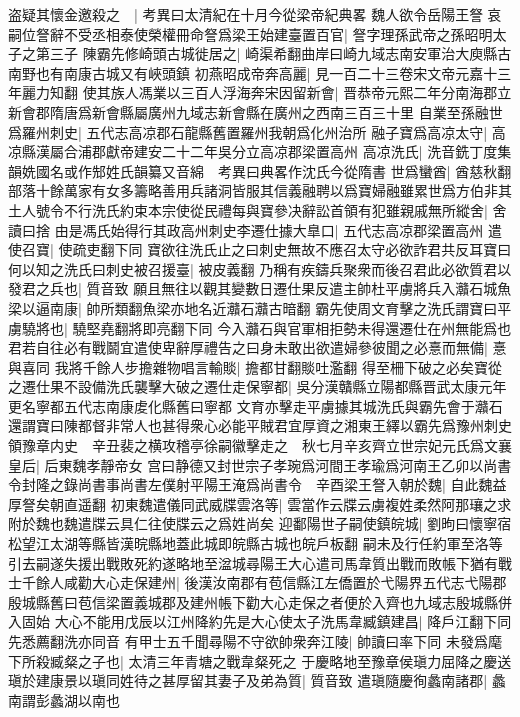 盗疑其懷金邀殺之　|{
	考異曰太清紀在十月今從梁帝紀典畧}
魏人欲令岳陽王詧哀嗣位詧辭不受丞相泰使榮權冊命詧爲梁王始建臺置百官|{
	詧字理孫武帝之孫昭明太子之第三子}
陳霸先修崎頭古城徙居之|{
	崎渠希翻曲岸曰崎九域志南安軍治大庾縣古南野也有南康古城又有峽頭鎮}
初燕昭成帝奔高麗|{
	見一百二十三卷宋文帝元嘉十三年麗力知翻}
使其族人馮業以三百人浮海奔宋因留新會|{
	晋恭帝元熙二年分南海郡立新會郡隋唐爲新會縣屬廣州九域志新會縣在廣州之西南三百三十里}
自業至孫融世爲羅州刺史|{
	五代志高凉郡石龍縣舊置羅州我朝爲化州治所}
融子寶爲高凉太守|{
	高凉縣漢屬合浦郡獻帝建安二十二年吳分立高凉郡梁置高州}
高凉洗氏|{
	洗音銑丁度集韻姺國名或作䢾姓氏韻纂又音綿　考異曰典畧作沈氏今從隋書}
世爲蠻酋|{
	酋慈秋翻}
部落十餘萬家有女多籌略善用兵諸洞皆服其信義融聘以爲寶婦融雖累世爲方伯非其土人號令不行洗氏約束本宗使從民禮每與寶參决辭訟首領有犯雖親戚無所縱舍|{
	舍讀曰捨}
由是馮氏始得行其政高州刺史李遷仕據大臯口|{
	五代志高凉郡梁置高州}
遣使召寶|{
	使疏吏翻下同}
寶欲往洗氏止之曰刺史無故不應召太守必欲詐君共反耳寶曰何以知之洗氏曰刺史被召援臺|{
	被皮義翻}
乃稱有疾鑄兵聚衆而後召君此必欲質君以發君之兵也|{
	質音致}
願且無往以觀其變數日遷仕果反遣主帥杜平虜將兵入灨石城魚梁以逼南康|{
	帥所類翻魚梁亦地名近灨石灨古暗翻}
霸先使周文育擊之洗氏謂寶曰平虜驍將也|{
	驍堅堯翻將即亮翻下同}
今入灨石與官軍相拒勢未得還遷仕在州無能爲也君若自往必有戰鬬宜遣使卑辭厚禮告之曰身未敢出欲遣婦參彼聞之必憙而無備|{
	憙與喜同}
我將千餘人步擔雜物唱言輸賧|{
	擔都甘翻賧吐濫翻}
得至柵下破之必矣寶從之遷仕果不設備洗氏襲擊大破之遷仕走保寧都|{
	吳分漢贛縣立陽都縣晋武太康元年更名寧都五代志南康䖍化縣舊曰寧都}
文育亦擊走平虜據其城洗氏與霸先會于灨石還謂寶曰陳都督非常人也甚得衆心必能平賊君宜厚資之湘東王繹以霸先爲豫州刺史領豫章内史　辛丑裴之横攻稽亭徐嗣徽擊走之　秋七月辛亥齊立世宗妃元氏爲文襄皇后|{
	后東魏孝靜帝女}
宫曰静德又封世宗子孝琬爲河間王孝瑜爲河南王乙卯以尚書令封隆之錄尚書事尚書左僕射平陽王淹爲尚書令　辛酉梁王詧入朝於魏|{
	自此魏益厚詧矣朝直遥翻}
初東魏遣儀同武威牒雲洛等|{
	雲當作云牒云虜複姓柔然阿那瓖之求附於魏也魏遣牒云具仁往使牒云之爲姓尚矣}
迎鄱陽世子嗣使鎮皖城|{
	劉昫曰懷寧宿松望江太湖等縣皆漢晥縣地蓋此城即皖縣古城也皖戶板翻}
嗣未及行任約軍至洛等引去嗣遂失援出戰敗死約遂略地至湓城尋陽王大心遣司馬韋質出戰而敗帳下猶有戰士千餘人咸勸大心走保建州|{
	後漢汝南郡有苞信縣江左僑置於弋陽界五代志弋陽郡殷城縣舊曰苞信梁置義城郡及建州帳下勸大心走保之者便於入齊也九域志殷城縣併入固始}
大心不能用戊辰以江州降約先是大心使太子洗馬韋臧鎮建昌|{
	降戶江翻下同先悉薦翻洗亦同音}
有甲士五千聞尋陽不守欲帥衆奔江陵|{
	帥讀曰率下同}
未發爲麾下所殺臧粲之子也|{
	太清三年青塘之戰韋粲死之}
于慶略地至豫章侯瑱力屈降之慶送瑱於建康景以瑱同姓待之甚厚留其妻子及弟為質|{
	質音致}
遣瑱隨慶徇蠡南諸郡|{
	蠡南謂彭蠡湖以南也}
